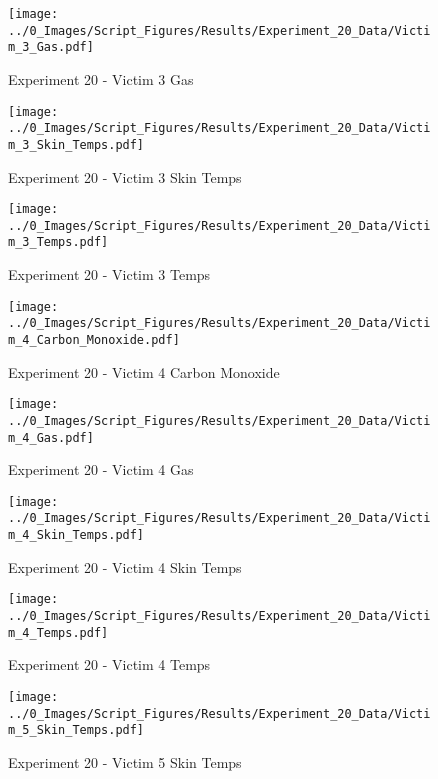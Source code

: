 	\begin{figure}[H]
		\centering
		\texttt{[image: ../0\_Images/Script\_Figures/Results/Experiment\_20\_Data/Victim\_3\_Gas.pdf]}
		\caption[]{Experiment 20 - Victim 3 Gas}
	\end{figure}
 
	\clearpage

	\begin{figure}[H]
		\centering
		\texttt{[image: ../0\_Images/Script\_Figures/Results/Experiment\_20\_Data/Victim\_3\_Skin\_Temps.pdf]}
		\caption[]{Experiment 20 - Victim 3 Skin Temps}
	\end{figure}
 

	\begin{figure}[H]
		\centering
		\texttt{[image: ../0\_Images/Script\_Figures/Results/Experiment\_20\_Data/Victim\_3\_Temps.pdf]}
		\caption[]{Experiment 20 - Victim 3 Temps}
	\end{figure}
 
	\clearpage

	\begin{figure}[H]
		\centering
		\texttt{[image: ../0\_Images/Script\_Figures/Results/Experiment\_20\_Data/Victim\_4\_Carbon\_Monoxide.pdf]}
		\caption[]{Experiment 20 - Victim 4 Carbon Monoxide}
	\end{figure}
 

	\begin{figure}[H]
		\centering
		\texttt{[image: ../0\_Images/Script\_Figures/Results/Experiment\_20\_Data/Victim\_4\_Gas.pdf]}
		\caption[]{Experiment 20 - Victim 4 Gas}
	\end{figure}
 
	\clearpage

	\begin{figure}[H]
		\centering
		\texttt{[image: ../0\_Images/Script\_Figures/Results/Experiment\_20\_Data/Victim\_4\_Skin\_Temps.pdf]}
		\caption[]{Experiment 20 - Victim 4 Skin Temps}
	\end{figure}
 

	\begin{figure}[H]
		\centering
		\texttt{[image: ../0\_Images/Script\_Figures/Results/Experiment\_20\_Data/Victim\_4\_Temps.pdf]}
		\caption[]{Experiment 20 - Victim 4 Temps}
	\end{figure}
 
	\clearpage

	\begin{figure}[H]
		\centering
		\texttt{[image: ../0\_Images/Script\_Figures/Results/Experiment\_20\_Data/Victim\_5\_Skin\_Temps.pdf]}
		\caption[]{Experiment 20 - Victim 5 Skin Temps}
	\end{figure}
 

